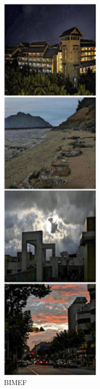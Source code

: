 \documentclass[CJK,aspectratio=169]{beamer}  %
\begin{document}
\begin{frame}
\begin{figure}
\begin{minipage}{.08\paperwidth}
			\label{fig: BIMEF}	
			\caption*{\tiny BIMEF}
		\end{minipage}
		\begin{minipage}{.08\paperwidth}
			\centering
			\setlength{\abovecaptionskip}{-0.45cm}
			\includegraphics[width=\linewidth]{picture/LLIE/LightingNet/NPE}

\end{minipage}
\end{figure}
\end{frame}
\end{document}
